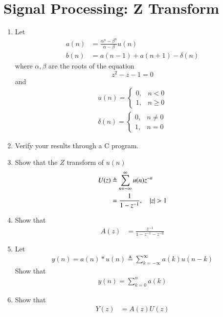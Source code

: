 \documentclass[journal,12pt,twocolumn]{IEEEtran}
\renewcommand\thesection{\arabic{section}}
\begin{document}
\section{Signal Processing: Z Transform}
\begin{enumerate}[label=\thesection.\arabic*
,ref=\thesection.\theenumi]

\item Let
\begin{align}
a(n) &= \frac{\alpha^n-\beta^n}{\alpha-\beta}u(n)
\\
b(n) &=a(n-1)+a(n+1) - \delta(n)
\end{align}
where $\alpha, \beta$ are the roots of the equation
\begin{equation}
z^2-z-1 = 0
\end{equation}
and
\begin{align}
u(n)
=
\begin{cases}
0, & n < 0
\\
1, & n \ge 0
\end{cases}
\\
\delta(n)
=
\begin{cases}
0, & n \ne 0
\\
1, & n = 0
\end{cases}
\end{align}
\item Verify your results through a C program.
\item Show that the $Z$ transform of $u(n)$
\begin{align}
U(z)&\triangleq \sum_{n=-\infty}^{\infty}u(n)z^{-n} 
\\
&= \frac{1}{1- z^{-1}}, \quad \left\vert z\right\vert > 1
\end{align}
\item  Show that 
\begin{align}
A(z)&= \frac{z^{-1}}{1- z^{-1}-z^{-2}}
\end{align}
\item Let 
\begin{align}
y(n)=a(n)*u(n) \triangleq \sum_{k=-\infty}^{\infty}a(k) u(n-k)
\end{align}
%
Show that 
\begin{align}
y(n) = \sum_{k=0}^{n}a(k) 
\end{align}
%
\item Show that 
\begin{align}
Y(z) &= A(z)U(z)
\\

\end{align}
\end{enumerate}
\end{document}

